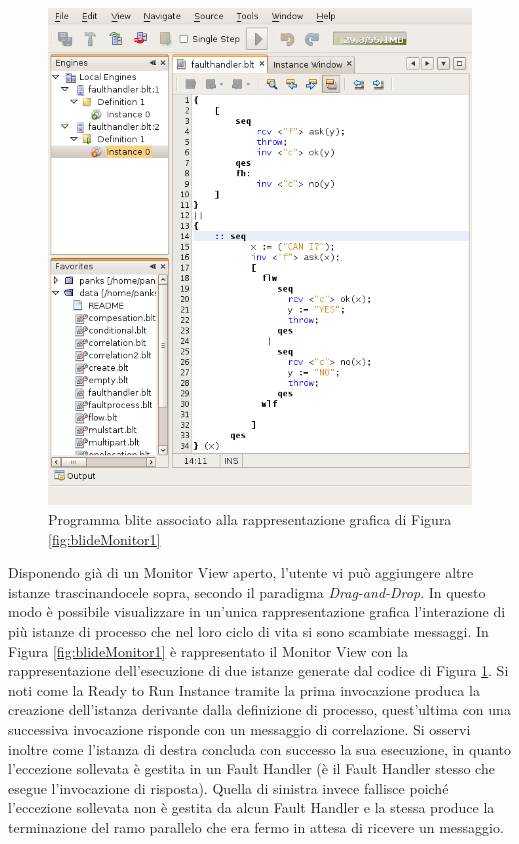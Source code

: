 \begin{figure}[!t]
\begin{center}
\includegraphics[scale=0.79]
{blide/dia/BlideMonitorCode}
\caption[Blide: programma blite]{Programma blite associato alla
rappresentazione grafica di Figura \ref{fig:blideMonitor1}}
  \label{fig:blideMonitorCode}
\end{center}
\end{figure}


Disponendo già di un Monitor View aperto, l'utente vi può aggiungere altre
istanze trascinandocele sopra, secondo il paradigma \emph{Drag-and-Drop}. In
questo modo è possibile visualizzare in un'unica rappresentazione grafica
l'interazione di più istanze di processo che nel loro ciclo di vita si sono
scambiate messaggi. In Figura \ref{fig:blideMonitor1} è rappresentato il
Monitor View con la rappresentazione dell'esecuzione di due istanze generate
dal codice di Figura \ref{fig:blideMonitorCode}. Si noti come la Ready to Run
Instance tramite la prima invocazione produca la creazione dell'istanza
derivante dalla definizione di processo, quest'ultima con una successiva
invocazione risponde con un messaggio di correlazione. Si osservi inoltre come
l'istanza di destra concluda con successo la sua esecuzione, in quanto
l'eccezione sollevata è gestita in un Fault Handler (è il Fault Handler stesso
che esegue l'invocazione di risposta). Quella di sinistra invece fallisce poiché
l'eccezione sollevata non è gestita da alcun Fault Handler e la stessa produce
la terminazione del ramo parallelo che era fermo in attesa di ricevere un
messaggio. 

